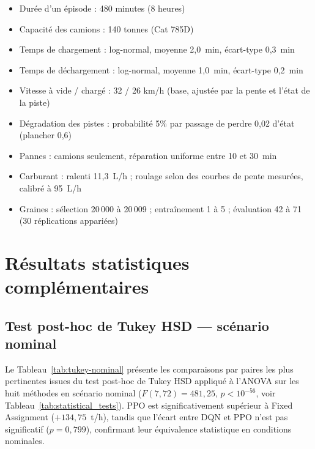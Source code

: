 \documentclass[11pt,a4paper]{report}
\begin{document}
\begin{itemize}
    \item Durée d'un épisode : 480 minutes (8 heures)
    \item Capacité des camions : 140 tonnes (Cat 785D)
    \item Temps de chargement : log-normal, moyenne 2,0~min, écart-type 0,3~min
    \item Temps de déchargement : log-normal, moyenne 1,0~min, écart-type 0,2~min
    \item Vitesse à vide / chargé : 32 / 26 km/h (base, ajustée par la pente et l'état de la piste)
    \item Dégradation des pistes : probabilité 5\% par passage de perdre 0,02 d'état (plancher 0,6)
    \item Pannes : camions seulement, réparation uniforme entre 10 et 30~min
    \item Carburant : ralenti 11,3~L/h ; roulage selon des courbes de pente mesurées, calibré à 95~L/h
    \item Graines : sélection 20\,000 à 20\,009 ; entraînement 1 à 5 ; évaluation 42 à 71 (30 réplications appariées)
\end{itemize}

\chapter{Résultats statistiques complémentaires}
\label{ann:stats}

\section*{Test post-hoc de Tukey HSD — scénario nominal}

Le Tableau~\ref{tab:tukey-nominal} présente les comparaisons par paires
les plus pertinentes issues du test post-hoc de Tukey HSD appliqué à
l'ANOVA sur les huit méthodes en scénario nominal
($F(7,72) = 481{,}25$, $p < 10^{-56}$, voir Tableau~\ref{tab:statistical_tests}).
PPO est significativement supérieur à Fixed Assignment
($+134{,}75$~t/h), tandis que l'écart entre DQN et PPO n'est pas
significatif ($p = 0{,}799$), confirmant leur équivalence statistique
en conditions nominales.
\end{document}
